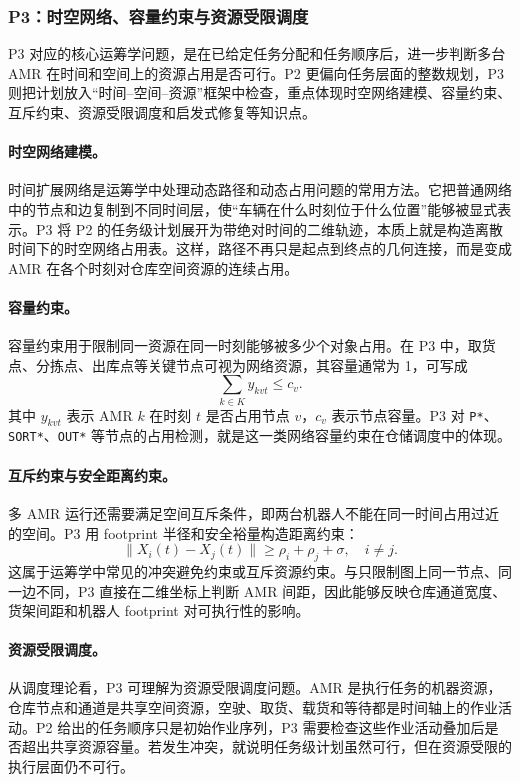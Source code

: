 \subsubsection{P3：时空网络、容量约束与资源受限调度}

P3 对应的核心运筹学问题，是在已给定任务分配和任务顺序后，进一步判断多台 AMR 在时间和空间上的资源占用是否可行。P2 更偏向任务层面的整数规划，P3 则把计划放入“时间--空间--资源”框架中检查，重点体现时空网络建模、容量约束、互斥约束、资源受限调度和启发式修复等知识点。

\paragraph{时空网络建模。}
时间扩展网络是运筹学中处理动态路径和动态占用问题的常用方法。它把普通网络中的节点和边复制到不同时间层，使“车辆在什么时刻位于什么位置”能够被显式表示。P3 将 P2 的任务级计划展开为带绝对时间的二维轨迹，本质上就是构造离散时间下的时空网络占用表。这样，路径不再只是起点到终点的几何连接，而是变成 AMR 在各个时刻对仓库空间资源的连续占用。

\paragraph{容量约束。}
容量约束用于限制同一资源在同一时刻能够被多少个对象占用。在 P3 中，取货点、分拣点、出库点等关键节点可视为网络资源，其容量通常为 1，可写成
\[
  \sum_{k\in K} y_{kvt}\le c_v .
\]
其中 $y_{kvt}$ 表示 AMR $k$ 在时刻 $t$ 是否占用节点 $v$，$c_v$ 表示节点容量。P3 对 \verb|P*|、\verb|SORT*|、\verb|OUT*| 等节点的占用检测，就是这一类网络容量约束在仓储调度中的体现。

\paragraph{互斥约束与安全距离约束。}
多 AMR 运行还需要满足空间互斥条件，即两台机器人不能在同一时间占用过近的空间。P3 用 footprint 半径和安全裕量构造距离约束：
\[
  \|X_i(t)-X_j(t)\|\ge \rho_i+\rho_j+\sigma ,
  \quad i\ne j .
\]
这属于运筹学中常见的冲突避免约束或互斥资源约束。与只限制图上同一节点、同一边不同，P3 直接在二维坐标上判断 AMR 间距，因此能够反映仓库通道宽度、货架间距和机器人 footprint 对可执行性的影响。

\paragraph{资源受限调度。}
从调度理论看，P3 可理解为资源受限调度问题。AMR 是执行任务的机器资源，仓库节点和通道是共享空间资源，空驶、取货、载货和等待都是时间轴上的作业活动。P2 给出的任务顺序只是初始作业序列，P3 需要检查这些作业活动叠加后是否超出共享资源容量。若发生冲突，就说明任务级计划虽然可行，但在资源受限的执行层面仍不可行。

